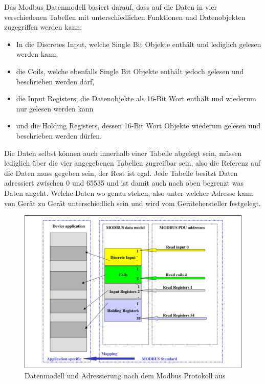 Das Modbus Datenmodell basiert darauf, dass auf die Daten in vier verschiedenen Tabellen mit unterschiedlichen Funktionen und Datenobjekten zugegriffen werden kann:
\begin{itemize}
	\item In die Discretes Input, welche Single Bit Objekte enthält und lediglich gelesen werden kann,
	\item die Coils, welche ebenfalls Single Bit Objekte enthält jedoch gelesen und beschrieben werden darf,
	\item die Input Registers, die Datenobjekte als 16-Bit Wort enthält und wiederum nur gelesen werden kann
	\item und die Holding Registers, dessen 16-Bit Wort Objekte wiederum gelesen und beschrieben werden dürfen.
\end{itemize}

Die Daten selbst können auch innerhalb einer Tabelle abgelegt sein, müssen lediglich über die vier angegebenen Tabellen zugreifbar sein, also die Referenz auf die Daten muss gegeben sein, der Rest ist egal. Jede Tabelle besitzt Daten adressiert zwischen 0 und 65535 und ist damit auch nach oben begrenzt was Daten angeht. Welche Daten wo genau stehen, also unter welcher Adresse kann von Gerät zu Gerät unterschiedlich sein und wird vom Gerätehersteller festgelegt. \cite[S.~6ff.]{mod12}

\begin{figure}
\centering
\includegraphics[width=\textwidth]{abbildungen/20160319_modbusadresse}
\caption[Datenmodell und Adressierung nach dem Modbus Protokoll]{Datenmodell und Adressierung nach dem Modbus Protokoll aus \cite[S.~8]{mod12}}
\label{fig:modbusadresse}
\end{figure}

